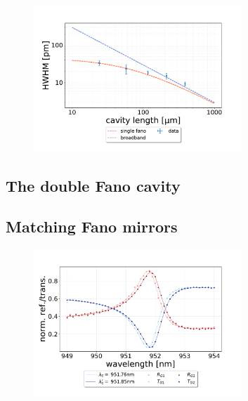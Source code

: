 \begin{figure}[h!]
    \centering
    \includegraphics[width=0.7\textwidth]{figures/results/HWHM_vs_cavity_length_single_fano.pdf}
    \caption{}
    \label{fig:HWHM_vs_time_single_fano_data}
\end{figure}

\subsection{The double Fano cavity}

\subsection{Matching Fano mirrors}

\begin{figure}[h!]
    \centering
    \includegraphics[width=0.7\textwidth]{figures/results/M3:M5/M3:M5_initial_spectra.pdf}
    \caption{}
    \label{}
\end{figure}

